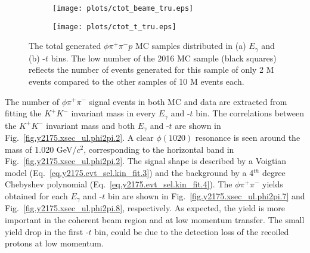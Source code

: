 \begin{figure}[H]
    \centering
    \begin{subfigure}[b]{0.5\textwidth}
        \texttt{[image: plots/ctot\_beame\_tru.eps]}
        \caption{}
        \label{fig.y2175.xsec_ul.phi2pi.1.a}
    \end{subfigure}\hfill
    \begin{subfigure}[b]{0.5\textwidth}
        \texttt{[image: plots/ctot\_t\_tru.eps]}
        \caption{}
        \label{fig.y2175.xsec_ul.phi2pi.1.b}
    \end{subfigure}
    \caption{\label{fig.y2175.xsec_ul.phi2pi.1}The total generated $\phi \pi^{+} \pi^{-} p$ MC samples distributed in (a) $E_{\gamma}$ and (b) -$t$ bins. The low number of the 2016 MC sample (black squares) reflects the number of events generated for this sample of only 2 M events compared to the other samples of 10 M events each.}
\end{figure}

The number of $\phi \pi^{+} \pi^{-}$ signal events in both MC and data are extracted from fitting the $K^+K^-$ invariant mass in every $E_{\gamma}$ and -$t$ bin. The correlations between the $K^+K^-$ invariant mass and both $E_{\gamma}$ and -$t$ are shown in Fig.~\ref{fig.y2175.xsec_ul.phi2pi.2}. A clear $\phi(1020)$ resonance is seen around the mass of 1.020 GeV/$c^2$, corresponding to the horizontal band in Fig.~\ref{fig.y2175.xsec_ul.phi2pi.2}. The signal shape is described by a Voigtian model (Eq.~\ref{eq.y2175.evt_sel.kin_fit.3}) and the background by a 4$^{th}$ degree Chebyshev polynomial (Eq.~\ref{eq.y2175.evt_sel.kin_fit.4}). The $\phi \pi^{+} \pi^{-}$ yields obtained for each $E_{\gamma}$ and -$t$ bin are shown in Fig.~\ref{fig.y2175.xsec_ul.phi2pi.7} and Fig.~\ref{fig.y2175.xsec_ul.phi2pi.8}, respectively. As expected, the yield is more important in the coherent beam region and at low momentum transfer. The small yield drop in the first -$t$ bin, could be due to the detection loss of the recoiled protons at low momentum. 


